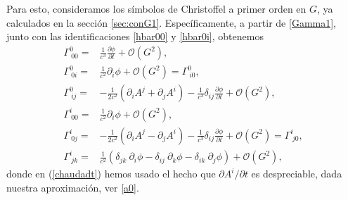 Para esto, consideramos los símbolos de Christoffel a primer orden en $G$, ya calculados en la sección \ref{sec:conG1}. Específicamente, a partir de \eqref{Gamma1}, junto con las identificaciones \eqref{hbar00} y \eqref{hbar0i}, obtenemos
\begin{align}
\Gamma^0_{\ 0 0}={}&\frac{1}{c^3}\frac{\partial \phi}{\partial t}+\mathcal{O}(G^2),\label{simbolo1}\\
\Gamma^0_{\ 0 i}={}&\frac{1}{c^2}\partial_i\phi+\mathcal{O}(G^2)=\Gamma^0_{\ i 0},\\
\Gamma^0_{\ i j}={}&-\frac{1}{2c^2}\left( \partial_i A^{j}+\partial_j A^{i}\right)-\frac{1}{c^3}\delta_{ij}\frac{\partial \phi}{\partial t}+\mathcal{O}(G^2),\label{simbolo3}\\
\Gamma^i_{\ 0 0}={}&\frac{1}{c^2}\partial_i \phi+\mathcal{O}(G^2),\label{chaudadt}\\
\Gamma^i_{\ 0 j}={}&-\frac{1}{2c^2}\left(\partial_i A^{j}-\partial_j A^{i}\right)-\frac{1}{c^3}\delta_{ij}\frac{\partial \phi}{\partial t}+\mathcal{O}(G^2)=\Gamma^i_{\ j 0},\\
\Gamma^i_{\ j k}={}&\frac{1}{c^2}\left( \delta_{jk}\ \partial_i\phi-\delta_{ij}\ \partial_k\phi-\delta_{ik}\ \partial_j\phi \right)+\mathcal{O}(G^2)\label{simbolo6},
\end{align}
donde en (\ref{chaudadt}) hemos usado el hecho que $\partial A^{i}/\partial t$ es despreciable, dada nuestra aproximación, ver \eqref{a0}.

